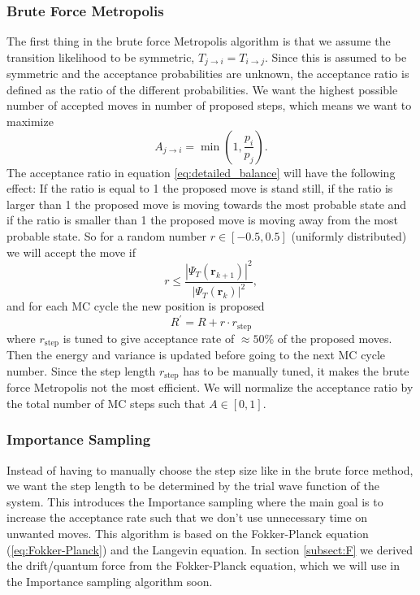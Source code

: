 \documentclass[12pt,a4paper,english]{article}
\begin{document}
\subsubsection{Brute Force Metropolis}
\label{subsubsect:brute_Metropolis}
The first thing in the brute force Metropolis algorithm is that we assume the transition likelihood to be symmetric, $T_{j\rightarrow i}=T_{i\rightarrow j}$. Since this is assumed to be symmetric and the acceptance probabilities are unknown, the acceptance ratio is defined as the ratio of the different probabilities. We want the highest possible number of accepted moves in number of proposed steps, which means we want to maximize 
\[A_{j\rightarrow i}=\min(1, \frac{p_i}{p_j}).\] 
The acceptance ratio in equation \ref{eq:detailed_balance} will have the following effect: If the ratio is equal to 1 the proposed move is stand still, if the ratio is larger than 1 the proposed move is moving towards the most probable state and if the ratio is smaller than 1 the proposed move is moving away from the most probable state. So for a random number $r\in[-0.5,0.5]$ (uniformly distributed) we will accept the move if
\begin{equation}
\label{eq:brute_accept_move}
r\leq\frac{|\Psi_T(\textbf{r}_{k+1})|^2}{|\Psi_T(\textbf{r}_k)|^2},
\end{equation}
and for each MC cycle the new position is proposed \[R^{\prime}=R+r\cdot r_{\text{step}}\]
where $r_{\text{step}}$ is tuned to give acceptance rate of $\approx50$\% of the proposed moves. Then the energy and variance is updated before going to the next MC cycle number. Since the step length $r_{\text{step}}$ has to be manually tuned, it makes the brute force Metropolis not the most efficient. We will normalize the acceptance ratio by the total number of MC steps such that $A\in[0,1]$.

\subsubsection{Importance Sampling}
\label{subsubsect:Importance}
Instead of having to manually choose the step size like in the brute force method, we want the step length to be determined by the trial wave function of the system. This introduces the Importance sampling where the main goal is to increase the acceptance rate such that we don't use unnecessary time on unwanted moves. This algorithm is based on the Fokker-Planck equation (\ref{eq:Fokker-Planck}) and the Langevin equation. In section \ref{subsect:F} we derived the drift/quantum force from the Fokker-Planck equation, which we will use in the Importance sampling algorithm soon.
\end{document}
